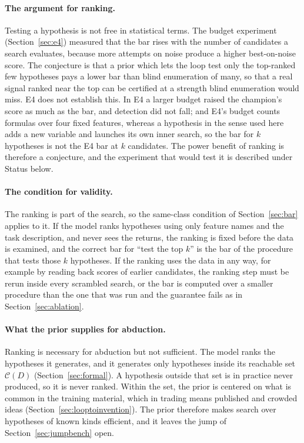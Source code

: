 \documentclass[11pt]{article}
\begin{document}
\paragraph{The argument for ranking.} Testing a hypothesis is not free in statistical terms. The
budget experiment (Section~\ref{sec:e4}) measured that the bar rises with the number of candidates a
search evaluates, because more attempts on noise produce a higher best-on-noise score. The conjecture is
that a prior which lets the loop test only the top-ranked few hypotheses pays a lower bar than blind
enumeration of many, so that a real signal ranked near the top can be certified at a strength blind
enumeration would miss. E4 does not establish this. In E4 a larger budget raised the champion's score as
much as the bar, and detection did not fall; and E4's budget counts formulas over four fixed features,
whereas a hypothesis in the sense used here adds a new variable and launches its own inner search, so
the bar for $k$ hypotheses is not the E4 bar at $k$ candidates. The power benefit of ranking is
therefore a conjecture, and the experiment that would test it is described under Status below.

\paragraph{The condition for validity.} The ranking is part of the search, so the same-class condition
of Section~\ref{sec:bar} applies to it. If the model ranks hypotheses using only feature names and the
task description, and never sees the returns, the ranking is fixed before the data is examined, and the
correct bar for ``test the top $k$'' is the bar of the procedure that tests those $k$ hypotheses. If
the ranking uses the data in
any way, for example by reading back scores of earlier candidates, the ranking step must be rerun inside
every scrambled search, or the bar is computed over a smaller procedure than the one that was run and
the guarantee fails as in Section~\ref{sec:ablation}.

\paragraph{What the prior supplies for abduction.} Ranking is necessary for abduction but not
sufficient. The model ranks the hypotheses it generates, and it generates only hypotheses inside its
reachable set $\mathcal{C}(D)$ (Section~\ref{sec:formal}). A hypothesis outside that set is in practice
never produced, so it is never ranked. Within the set, the prior is centered on what is common in the
training material, which in trading means published and crowded ideas
(Section~\ref{sec:looptoinvention}). The prior therefore makes search over hypotheses of known kinds efficient, and it leaves the jump of
Section~\ref{sec:jumpbench} open.
\end{document}
